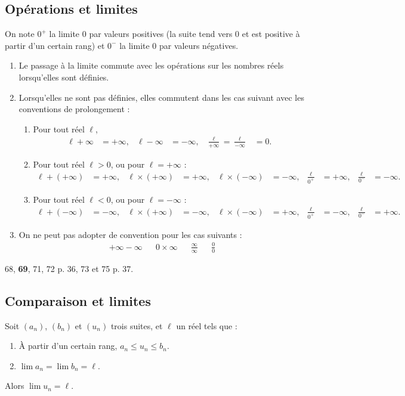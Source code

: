 \documentclass[a4paper,11pt,DIV20,BCOR0mm]{scrartcl}
\begin{document}
\subsection{Opérations et limites}
On note $0^+$ la limite 0 par valeurs positives (la suite tend vers 0 et 
est positive à partir d'un certain rang) et $0^-$ la limite 0 par valeurs négatives.
\begin{theoreme}[Admis]
\begin{enumerate}
 \item Le passage à la limite commute avec les opérations sur les nombres réels
lorsqu'elles sont définies.
  \item Lorsqu'elles ne sont pas définies, elles commutent dans les cas suivant avec les conventions de prolongement :
  \begin{enumerate}
   \item Pour tout réel $\ell$,\begin{align*}
	  \ell+\infty&=+\infty,&\ell-\infty&=-\infty,&\frac{\ell}{+\infty}=\frac{\ell}{-\infty}&=0.
	  \end{align*}
   \item Pour tout réel $\ell>0$, ou pour $\ell=+\infty$ :\begin{align*}
	  \ell+(+\infty)&=+\infty,&\ell\times(+\infty)&=+\infty,&\ell\times(-\infty)&=-\infty,
			  &\frac{\ell}{0^+}&=+\infty,&\frac{\ell}{0^-}&=-\infty.
	  \end{align*}
    \item Pour tout réel $\ell<0$, ou pour $\ell=-\infty$ :\begin{align*}
	  \ell+(-\infty)&=-\infty,&\ell\times(+\infty)&=-\infty,&\ell\times(-\infty)&=+\infty,
			  &\frac{\ell}{0^+}&=-\infty,&\frac{\ell}{0^-}&=+\infty.
	  \end{align*}
  \end{enumerate}
  \item On ne peut pas adopter de convention pour les cas suivants :
    \begin{align*}
    +\infty-\infty&&0\times\infty&&\frac{\infty}{\infty}&&\frac{0}{0}
\end{align*}
\end{enumerate}
\end{theoreme}

\begin{exercice}
 68, \textbf{69}, 71, 72 p. 36, 73 et 75 p. 37.
\end{exercice}


\subsection{Comparaison et limites}
\begin{theoreme}
 Soit $(a_n)$, $(b_n)$ et $(u_n)$ trois suites, et $\ell$ un réel tels que :
\begin{enumerate}
 \item \`A partir d'un certain rang, $a_n\leq u_n\leq b_n$.
 \item $\displaystyle\lim a_n=\lim b_n=\ell$.
\end{enumerate}
Alors $\displaystyle\lim u_n=\ell$.
\end{theoreme}
\end{document}
